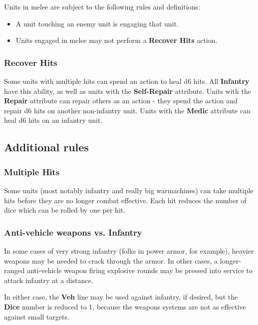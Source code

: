\documentclass[12pt,titlepage]{article}
\begin{document}
\begin{multicols}{2}
 Units in melee are subject to the following rules and definitions:

 \begin{itemize}
 \item A unit touching an enemy unit is engaging that unit. 
 \item Units engaged in melee may not perform a {\bf Recover Hits}
   action.
 \end{itemize}

\subsubsection{Recover Hits}

Some units with multiple hits can spend an action to heal d6 hits. All
{\bf Infantry} have this ability, as well as units with the {\bf
  Self-Repair} attribute. Units with the {\bf Repair} attribute can
repair others as an action - they spend the action and repair d6 hits
on another non-infantry unit. Units with the {\bf Medic} attribute can
heal d6 hits on an infantry unit.

\subsection{Additional rules}

\subsubsection{Multiple Hits}

Some units (most notably infantry and really big warmachines) can take
multiple hits before they are no longer combat effective. Each hit
reduces the number of dice which can be rolled by one per hit.

\subsubsection{Anti-vehicle weapons vs. Infantry}

In some cases of very strong infantry (folks in power armor, for
example), heavier weapons may be needed to crack through the armor. In
other cases, a longer-ranged anti-vehicle weapon firing explosive
rounds may be pressed into service to attack infantry at a
distance.

In either case, the {\bf Veh} line may be used against infantry, if
desired, but the {\bf Dice} number is reduced to 1, because the
weapons systems are not as effective against small targets.


\end{multicols}
\end{document}

